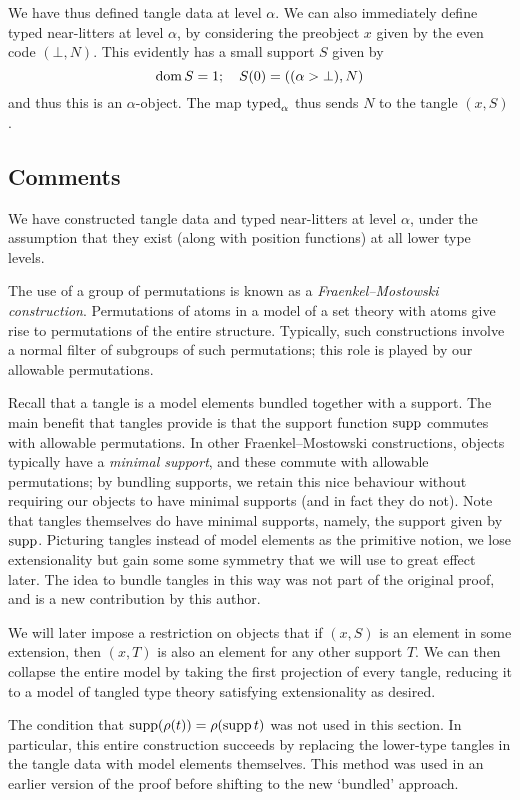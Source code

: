 We have thus defined tangle data at level \( \alpha \).
We can also immediately define typed near-litters at level \( \alpha \), by considering the preobject \( x \) given by the even code \( (\bot, N) \).
This evidently has a small support \( S \) given by
\[ \operatorname{dom} S = 1;\quad S(0) = ((\alpha > \bot), N) \]
and thus this is an \( \alpha \)-object.
The map \( \operatorname{typed}_\alpha \) thus sends \( N \) to the tangle \( (x, S) \).

\subsection{Comments}

We have constructed tangle data and typed near-litters at level \( \alpha \), under the assumption that they exist (along with position functions) at all lower type levels.

The use of a group of permutations is known as a \emph{Fraenkel--Mostowski construction}.
Permutations of atoms in a model of a set theory with atoms give rise to permutations of the entire structure.
Typically, such constructions involve a normal filter of subgroups of such permutations; this role is played by our allowable permutations.

Recall that a tangle is a model elements bundled together with a support.
The main benefit that tangles provide is that the support function \( \operatorname{supp} \) commutes with allowable permutations.
In other Fraenkel--Mostowski constructions, objects typically have a \emph{minimal support}, and these commute with allowable permutations; by bundling supports, we retain this nice behaviour without requiring our objects to have minimal supports (and in fact they do not).
Note that tangles themselves do have minimal supports, namely, the support given by \( \operatorname{supp} \).
Picturing tangles instead of model elements as the primitive notion, we lose extensionality but gain some some symmetry that we will use to great effect later.
The idea to bundle tangles in this way was not part of the original proof, and is a new contribution by this author.

We will later impose a restriction on objects that if \( (x, S) \) is an element in some extension, then \( (x, T) \) is also an element for any other support \( T \).
We can then collapse the entire model by taking the first projection of every tangle, reducing it to a model of tangled type theory satisfying extensionality as desired.

The condition that \( \operatorname{supp}(\rho(t)) = \rho(\operatorname{supp} t) \) was not used in this section.
In particular, this entire construction succeeds by replacing the lower-type tangles in the tangle data with model elements themselves.
This method was used in an earlier version of the proof before shifting to the new `bundled' approach.
